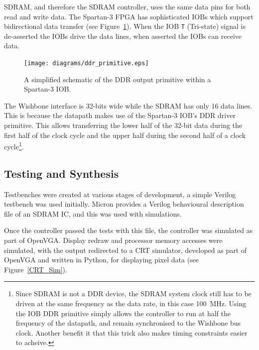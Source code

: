 SDRAM, and therefore the SDRAM controller, uses the same data pins for both read
and write data. The Spartan-3 FPGA has sophisticated IOBs which support
bidirectional data transfer (see Figure~\ref{MEM_DDR_IOB}). When the IOB
\texttt{T} (Tri-state) signal is de-asserted the IOBs drive the data lines, when
asserted the IOBs can receive data.

\begin{figure}[h!]
\begin{center}
\texttt{[image: diagrams/ddr\_primitive.eps]}
\caption[Spartan-3 DDR IOB Primitive]{A simplified schematic of the DDR output
primitive within a Spartan-3 IOB\cite{Xilinx_SP3_DS}.}
\label{MEM_DDR_IOB}
\end{center}
\end{figure}

The Wishbone interface is 32-bits wide while the SDRAM has only 16 data lines.
This is because the datapath makes use of the Spartan-3 IOB's DDR driver
primitive. This allows transferring the lower half of the 32-bit data during the
first half of the clock cycle and the upper half during the second half of a
clock cycle\footnote{Since SDRAM is not a DDR device, the SDRAM system clock
still has to be driven at the same frequency as the data rate, in this case
100~MHz. Using the IOB DDR primitive simply allows the controller to run at half
the frequency of the datapath, and remain synchronised to the Wishbone bus clock.
Another benefit it that this trick also makes timing constraints easier to
acheive.}.


\subsection{Testing and Synthesis}
Testbenches were created at various stages of development, a simple Verilog
testbench was used initially. Micron provides a Verilog behavioural description
file of an SDRAM IC, and this was used with simulations.

Once the controller passed the tests with this file, the controller was simulated
as part of OpenVGA. Display redraw and processor memory accesses were simulated,
with the output redirected to a CRT simulator, developed as part of OpenVGA and
written in Python, for displaying pixel data (see Figure~\ref{CRT_Sim}).

